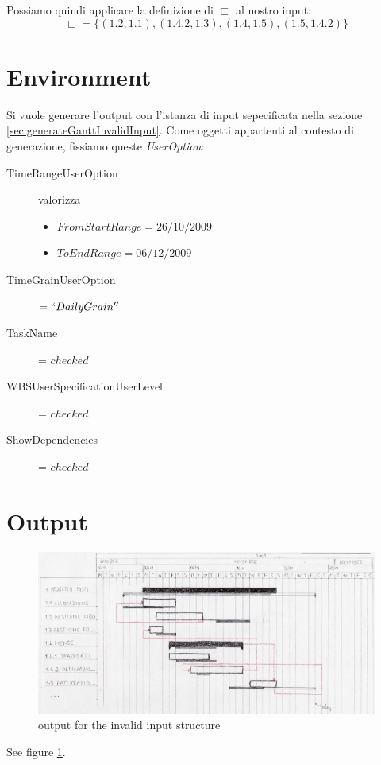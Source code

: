 Possiamo quindi applicare la definizione di $\sqsubset$ al nostro input:
\begin{displaymath}
\sqsubset = \lbrace (1.2, 1.1), (1.4.2, 1.3), (1.4, 1.5), (1.5, 1.4.2)
\rbrace
\end{displaymath}

\section{Environment}
Si vuole generare l'output con l'istanza di input sepecificata nella sezione
\ref{sec:generateGanttInvalidInput}. Come oggetti appartenti al contesto di
generazione, fissiamo queste \emph{UserOption}:
\begin{description}
  \item[TimeRangeUserOption] valorizza
  \begin{itemize}
  \item $FromStartRange = 26/10/2009$
  \item $ToEndRange = 06/12/2009$
  \end{itemize} 
  \item[TimeGrainUserOption] $= ``DailyGrain''$
  \item[TaskName] = $checked$
  \item[WBSUserSpecificationUserLevel] = $checked$
  \item[ShowDependencies] = $checked$
\end{description}

\section{Output}
\begin{figure} 
\centering
\includegraphics[width=1\textwidth]{case_spec/generate_Gantt/invalidOutput.png}
\caption{output for the invalid input structure}
\label{fig:generateGanttInvalidOutputMockup}
\end{figure}
See figure \ref{fig:generateGanttInvalidOutputMockup}.


